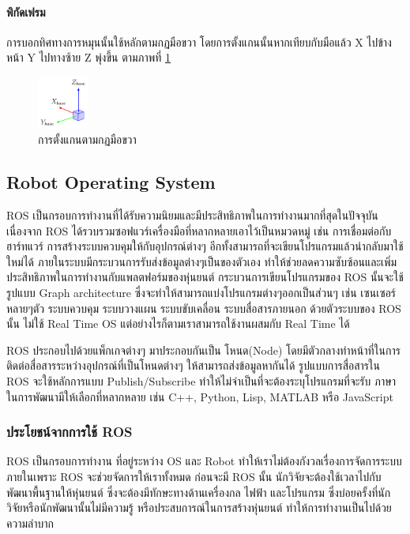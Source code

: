 \paragraph*{พิกัดเฟรม}
การบอกทิศทางการหมุนนั้นใช้หลักตามกฏมือขวา โดยการตั้งแกนนั้นหากเทียบกับมือแล้ว X ไปข้างหน้า Y ไปทางซ้าย Z พุ่งขึ้น ตามภาพที่ \ref{fig:right_hand_rule}
\begin{figure}[ht]
	\centering
	\includegraphics[width=0.15\textwidth]{chapter2/images/right_hand_rule.png}
	\caption{การตั้งแกนตามกฏมือขวา}
	\label{fig:right_hand_rule}
\end{figure}

\subsection{Robot Operating System}
ROS เป็นกรอบการทำงานที่ได้รับความนิยมและมีประสิทธิภาพในการทำงานมากที่สุดในปัจจุบัน เนื่องจาก ROS
ได้รวบรวมซอฟแวร์เครื่องมือที่หลากหลายเอาไว้เป็นหมวดหมู่ เช่น การเชื่อมต่อกับฮาร์ทแวร์
การสร้างระบบควบคุมให้กับอุปกรณ์ต่างๆ อีกทั้งสามารถที่จะเขียนโปรแกรมแล้วนำกลับมาใช้ใหม่ได้
ภายในระบบมีกระบวนการรับส่งข้อมูลต่างๆเป็นของตัวเอง ทำให้ช่วยลดความซับซ้อนและเพิ่มประสิทธิภาพในการทำงานกับแพลตฟอร์มของหุ่นยนต์
กระบวนการเขียนโปรแกรมของ ROS นั้นจะใช้รูปแบบ Graph architecture ซึ่งจะทำให้สามารถแบ่งโปรแกรมต่างๆออกเป็นส่วนๆ เช่น
เซนเซอร์หลายๆตัว ระบบควบคุม ระบบวางแผน ระบบขับเคลื่อน ระบบสื่อสารภายนอก ด้วยตัวระบบของ ROS นั้น ไม่ใช้ Real Time OS
แต่อย่างไรก็ตามเราสามารถใช้งานผสมกับ Real Time ได้

ROS ประกอบไปด้วยแพ็กเกจต่างๆ มาประกอบกันเป็น โหนด(Node) โดยมีตัวกลางทำหน้าที่ในการติดต่อสื่อสารระหว่างอุปกรณ์ที่เป็นโหนดต่างๆ
ให้สามารถส่งข้อมูลหากันได้ รูปแบบการสื่อสารใน ROS จะใช้หลักการแบบ Publish/Subscribe ทำให้ไม่จำเป็นที่จะต้องระบุโปรแกรมที่จะรับ
ภาษาในการพัฒนามีให้เลือกที่หลากหลาย เช่น C++, Python, Lisp, MATLAB หรือ JavaScript 

\subsubsection*{ประโยชน์จากการใช้ ROS}
ROS เป็นกรอบการทำงาน ที่อยู่ระหว่าง OS และ Robot ทำให้เราไม่ต้องกังวลเรื่องการจัดการระบบภายในเพราะ
ROS จะช่วยจัดการให้เราทั้งหมด ก่อนจะมี ROS นั้น นักวิจัยจะต้องใช้เวลาไปกับพัฒนาพื้นฐานให้หุ่นยนต์
ซึ่งจะต้องมีทักษะทางด้านเครื่องกล ไฟฟ้า และโปรแกรม ซึ่งบ่อยครั้งที่นักวิจัยหรือนักพัฒนานั้นไม่มีความรู้
หรือประสบการณ์ในการสร้างหุ่นยนต์ ทำให้การทำงานเป็นไปด้วยความลำบาก